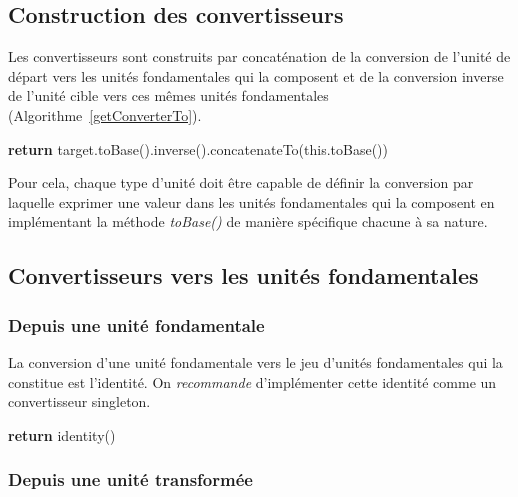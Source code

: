 \documentclass[a4paper,twoside,10pt]{article}
\begin{document}
\subsection{Construction des convertisseurs}

Les convertisseurs sont construits par concaténation de la conversion de l'unité de départ vers les unités fondamentales
qui la composent et de la conversion inverse de l'unité cible vers ces mêmes unités fondamentales
(Algorithme~\ref{getConverterTo}).

\begin{algorithm}[!h]
\caption{Implémentation de Unit.getConverterTo()}\label{getConverterTo}
\begin{algorithmic}
\State \textbf{return} target.toBase().inverse().concatenateTo(this.toBase())
\EndProcedure
\end{algorithmic}
\end{algorithm}

Pour cela, chaque type d'unité doit être capable de définir la conversion par laquelle exprimer une valeur dans les
unités fondamentales qui la composent en implémentant la méthode \emph{toBase()} de manière spécifique chacune à sa
nature.

\subsection{Convertisseurs vers les unités fondamentales}


\subsubsection{Depuis une unité fondamentale}

La conversion d'une unité fondamentale vers le jeu d'unités fondamentales qui la constitue est l'identité. On
\emph{recommande} d'implémenter cette identité comme un convertisseur singleton.

\begin{algorithm}[!h]
\caption{Implémentation de FundamentalUnit.toBase()}\label{fundamentalToBase}
\begin{algorithmic}
\State \textbf{return} identity()
\EndProcedure
\end{algorithmic}
\end{algorithm}


\subsubsection{Depuis une unité transformée}
\end{document}
